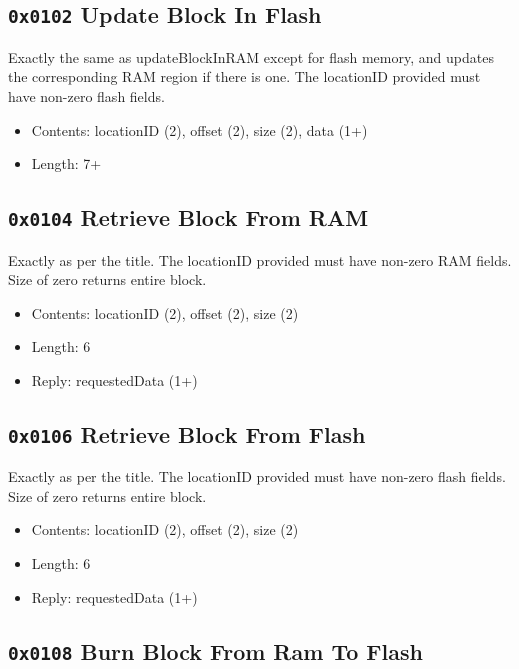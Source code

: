 \documentclass[12pt,a4paper,titlepage]{article}
\begin{document}
\subsection{\texttt{0x0102} Update Block In Flash}

Exactly the same as updateBlockInRAM except for flash memory, and updates the corresponding RAM region if there is one. The locationID provided must have non-zero flash fields.

\begin{itemize}
\item Contents: locationID (2),  offset (2), size (2), data (1+)
\item Length: 7+
\end{itemize}


\subsection{\texttt{0x0104} Retrieve Block From RAM}

Exactly as per the title. The locationID provided must have non-zero RAM fields. Size of zero returns entire block.

\begin{itemize}
\item Contents: locationID (2),  offset (2), size (2)
\item Length: 6
\item Reply: requestedData (1+)
\end{itemize}


\newpage
\subsection{\texttt{0x0106} Retrieve Block From Flash}

Exactly as per the title. The locationID provided must have non-zero flash fields. Size of zero returns entire block.

\begin{itemize}
\item Contents: locationID (2),  offset (2), size (2)
\item Length: 6
\item Reply: requestedData (1+)
\end{itemize}


\subsection{\texttt{0x0108} Burn Block From Ram To Flash}
\end{document}
